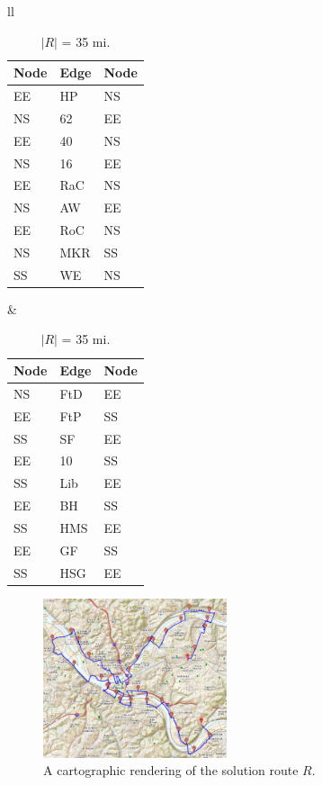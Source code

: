 \documentclass[twocolumn]{article}
\theoremstyle{plain}  %
\theoremstyle{definition}  %
\theoremstyle{remark}  %
\begin{document}
\begin{table}[t]
	\centering
	\small
	\begin{tabular}{ll}
	\begin{tabular}{|l|l|l|}
		\hline
		Node & Edge & Node \\
		\hline
		EE & HP & NS \\
		NS & 62 & EE \\
		EE & 40 & NS \\
		NS & 16 & EE \\
		EE & RaC & NS \\
		NS & AW & EE \\
		EE & RoC & NS \\
		NS & MKR & SS \\
		SS & WE & NS \\
		\hline
	\end{tabular}
	&
	\begin{tabular}{|l|l|l|}
		\hline
		Node & Edge & Node \\
		\hline
		NS & FtD & EE \\
		EE & FtP & SS \\
		SS & SF & EE \\
		EE & 10 & SS \\
		SS & Lib & EE \\
		EE & BH & SS \\
		SS & HMS & EE \\
		EE & GF & SS \\
		SS & HSG & EE \\
		\hline
	\end{tabular}
	\end{tabular}
	\caption{$|R|$ = 35 mi.}
	\label{tab:solution}
\end{table}

\begin{figure}[t]
	\centering
	\includegraphics[width=0.48\textwidth]{solution.png}
	\caption{A cartographic rendering of the solution route $R$.}
	\label{fig:solution}
\end{figure}
\end{document}
